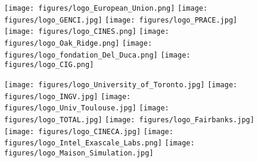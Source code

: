 \begin{figure}[htbp]
%
\noindent \begin{centering}
\texttt{[image: figures/logo\_European\_Union.png]}\vspace*{2truemm}
\texttt{[image: figures/logo\_GENCI.jpg]}\vspace*{2truemm}
\texttt{[image: figures/logo\_PRACE.jpg]}\vspace*{2truemm}
\texttt{[image: figures/logo\_CINES.png]}\vspace*{2truemm}
\texttt{[image: figures/logo\_Oak\_Ridge.png]}\vspace*{2truemm}
\hspace*{3mm}\texttt{[image: figures/logo\_fondation\_Del\_Duca.png]}\vspace*{2truemm}
\texttt{[image: figures/logo\_CIG.png]}\vspace*{2truemm}
\par\end{centering}
%
\vspace*{-2truemm}
%
\noindent \begin{centering}
\texttt{[image: figures/logo\_University\_of\_Toronto.jpg]}\vspace*{2truemm}
\texttt{[image: figures/logo\_INGV.jpg]}\vspace*{2truemm}
\texttt{[image: figures/logo\_Univ\_Toulouse.jpg]}\vspace*{2truemm}
\texttt{[image: figures/logo\_TOTAL.jpg]}\vspace*{2truemm}
\texttt{[image: figures/logo\_Fairbanks.jpg]}\vspace*{2truemm}
\texttt{[image: figures/logo\_CINECA.jpg]}\vspace*{2truemm}
\texttt{[image: figures/logo\_Intel\_Exascale\_Labs.png]}\vspace*{2truemm}
\texttt{[image: figures/logo\_Maison\_Simulation.jpg]}
\par\end{centering}
\end{figure}


